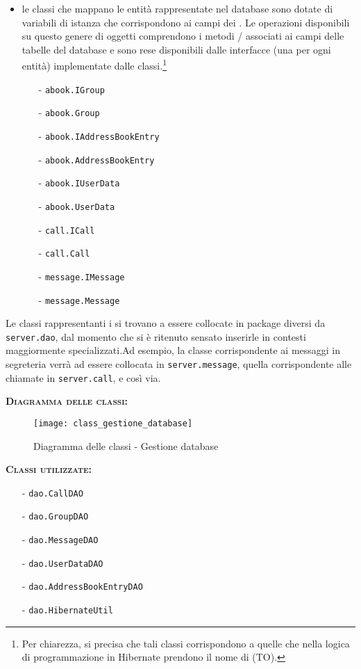 \begin{description}
\begin{itemize}
	\item le classi che mappano le entità rappresentate nel database sono dotate di variabili di istanza che corrispondono ai campi dei . Le operazioni disponibili su questo genere di oggetti comprendono i metodi / associati ai campi delle tabelle del database e sono rese disponibili dalle interfacce (una per ogni entità) implementate dalle classi.\footnote{%
	Per chiarezza, si precisa che tali classi corrispondono a quelle che nella logica di programmazione in Hibernate prendono il nome di  (TO)\@.
	}
	\begin{itemize}
	  \item[-] \texttt{abook.IGroup}
	  \item[-] \texttt{abook.Group}
	  \item[-] \texttt{abook.IAddressBookEntry}
	  \item[-] \texttt{abook.AddressBookEntry}
	  \item[-] \texttt{abook.IUserData}
	  \item[-] \texttt{abook.UserData}
		\item[-] \texttt{call.ICall}
	  \item[-] \texttt{call.Call}
	  \item[-] \texttt{message.IMessage}
	  \item[-] \texttt{message.Message}
	\end{itemize}
\end{itemize}

Le classi rappresentanti i  si trovano a essere collocate in package diversi da \texttt{server.dao}, dal momento che si è ritenuto sensato inserirle in contesti maggiormente specializzati.Ad esempio, la classe corrispondente ai messaggi in segreteria verrà ad essere collocata in \texttt{server.message}, quella corrispondente alle chiamate in \texttt{server.call}, e così via.

\item{\scshape\bfseries Diagramma delle classi:}
\begin{figure}[H]
  \centering
  \texttt{[image: class\_gestione\_database]}
  \caption{Diagramma delle classi - Gestione database}\label{fig:gestionedatabase}
\end{figure}

	\item{\scshape\bfseries Classi utilizzate:}
	\begin{itemize}[nolistsep, noitemsep]
	  \item[-] \texttt{dao.CallDAO}
	  \item[-] \texttt{dao.GroupDAO}
	  \item[-] \texttt{dao.MessageDAO}
	  \item[-] \texttt{dao.UserDataDAO}
	  \item[-] \texttt{dao.AddressBookEntryDAO}
	  \item[-] \texttt{dao.HibernateUtil}
	\end{itemize}
\end{description}

